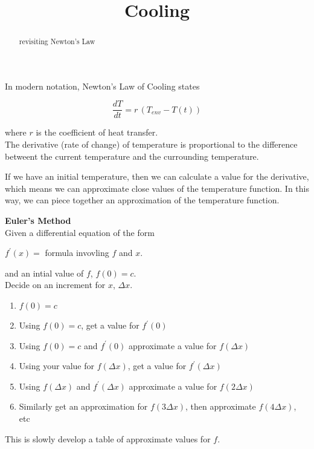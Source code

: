 \documentclass{ximera}
\title{Cooling}
\begin{document}
\begin{abstract}
  revisiting Newton's Law
\end{abstract}
\maketitle




In modern notation, Newton's Law of Cooling states


\[
\frac{dT}{dt} = r \, (T_{env} - T(t))
\]

where $r$ is the coefficient of heat transfer.\\





The derivative (rate of change) of temperature is proportional to the difference betweent the current temperature and the currounding temperature.




If we have an initial temperature, then we can calculate a value for the derivative, which means we can approximate close values of the temperature function.  In this way, we can piece together an approximation of the temperature function.


\begin{procedure}  \textbf{\textcolor{blue!55!black}{Euler's Method}} \\

Given a differential equation of the form
\begin{center}
$f^{\prime}(x) =$ formula invovling $f$ and $x$.
\end{center}

and an intial value of $f$, $f(0) = c$. \\


Decide on an increment for $x$, $\Delta x$.

\begin{enumerate}[label=(\arabic*)]
\item $f(0) = c$
\item Using $f(0) = c$, get a value for $f^{\prime}(0)$
\item Using $f(0) = c$ and $f^{\prime}(0)$ approximate a value for $f(\Delta x)$
\item Using your value for $f(\Delta x)$, get a value for $f^{\prime}(\Delta x)$
\item Using $f(\Delta x)$ and $f^{\prime}(\Delta x)$ approximate a value for $f(2 \Delta x)$
\item Similarly get an approximation for $f(3 \Delta x)$, then approximate $f(4 \Delta x)$, etc
\end{enumerate}

This is slowly develop a table of approximate values for $f$.

\end{procedure}
\end{document}
